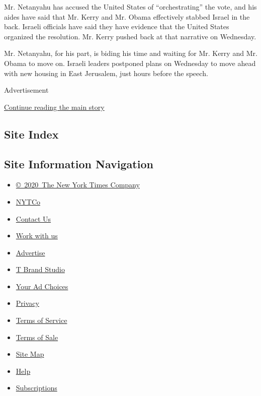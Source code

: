 Mr. Netanyahu has accused the United States of ``orchestrating'' the
vote, and his aides have said that Mr. Kerry and Mr. Obama effectively
stabbed Israel in the back. Israeli officials have said they have
evidence that the United States organized the resolution. Mr. Kerry
pushed back at that narrative on Wednesday.

Mr. Netanyahu, for his part, is biding his time and waiting for Mr.
Kerry and Mr. Obama to move on. Israeli leaders postponed plans on
Wednesday to move ahead with new housing in East Jerusalem, just hours
before the speech.

Advertisement

\protect\hyperlink{after-bottom}{Continue reading the main story}

\hypertarget{site-index}{%
\subsection{Site Index}\label{site-index}}

\hypertarget{site-information-navigation}{%
\subsection{Site Information
Navigation}\label{site-information-navigation}}

\begin{itemize}
\tightlist
\item
  \href{https://help.nytimes.com/hc/en-us/articles/115014792127-Copyright-notice}{©~2020~The
  New York Times Company}
\end{itemize}

\begin{itemize}
\tightlist
\item
  \href{https://www.nytco.com/}{NYTCo}
\item
  \href{https://help.nytimes.com/hc/en-us/articles/115015385887-Contact-Us}{Contact
  Us}
\item
  \href{https://www.nytco.com/careers/}{Work with us}
\item
  \href{https://nytmediakit.com/}{Advertise}
\item
  \href{http://www.tbrandstudio.com/}{T Brand Studio}
\item
  \href{https://www.nytimes.com/privacy/cookie-policy\#how-do-i-manage-trackers}{Your
  Ad Choices}
\item
  \href{https://www.nytimes.com/privacy}{Privacy}
\item
  \href{https://help.nytimes.com/hc/en-us/articles/115014893428-Terms-of-service}{Terms
  of Service}
\item
  \href{https://help.nytimes.com/hc/en-us/articles/115014893968-Terms-of-sale}{Terms
  of Sale}
\item
  \href{https://spiderbites.nytimes.com}{Site Map}
\item
  \href{https://help.nytimes.com/hc/en-us}{Help}
\item
  \href{https://www.nytimes.com/subscription?campaignId=37WXW}{Subscriptions}
\end{itemize}
